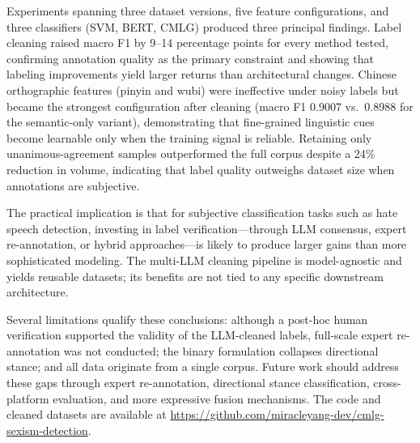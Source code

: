 ﻿\documentclass[12pt]{article}
\begin{document}
Experiments spanning three dataset versions, five feature configurations, and three classifiers (SVM, BERT, CMLG) produced three principal findings. Label cleaning raised macro F1 by 9--14 percentage points for every method tested, confirming annotation quality as the primary constraint and showing that labeling improvements yield larger returns than architectural changes. Chinese orthographic features (pinyin and wubi) were ineffective under noisy labels but became the strongest configuration after cleaning (macro F1 0.9007 vs.\ 0.8988 for the semantic-only variant), demonstrating that fine-grained linguistic cues become learnable only when the training signal is reliable. Retaining only unanimous-agreement samples outperformed the full corpus despite a 24\% reduction in volume, indicating that label quality outweighs dataset size when annotations are subjective.

The practical implication is that for subjective classification tasks such as hate speech detection, investing in label verification---through LLM consensus, expert re-annotation, or hybrid approaches---is likely to produce larger gains than more sophisticated modeling. The multi-LLM cleaning pipeline is model-agnostic and yields reusable datasets; its benefits are not tied to any specific downstream architecture.

Several limitations qualify these conclusions: although a post-hoc human verification supported the validity of the LLM-cleaned labels, full-scale expert re-annotation was not conducted; the binary formulation collapses directional stance; and all data originate from a single corpus. Future work should address these gaps through expert re-annotation, directional stance classification, cross-platform evaluation, and more expressive fusion mechanisms. The code and cleaned datasets are available at \url{https://github.com/miracleyang-dev/cmlg-sexism-detection}.

\printbibliography
\end{document}
